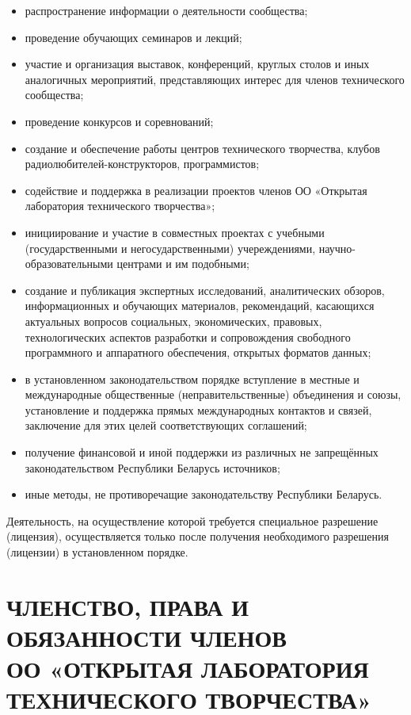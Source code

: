 \documentclass[a4paper,fontsize=14pt,titlepage]{scrartcl}
\newcommand{\OOname}{«Открытая лаборатория технического творчества»}
\newcommand{\OONAME}{«ОТКРЫТАЯ ЛАБОРАТОРИЯ ТЕХНИЧЕСКОГО ТВОРЧЕСТВА»}
\newcommand{\OO}{ОО \OOname}
\begin{document}
\begin{itemize}
\item распространение информации о деятельности сообщества;
\item проведение обучающих семинаров и лекций;
\item участие и организация выставок, конференций, круглых столов и иных аналогичных мероприятий, представляющих интерес для
членов технического сообщества;
\item проведение конкурсов и соревнований;
\item создание и обеспечение работы центров технического творчества,
клубов радиолюбителей-конструкторов, программистов;
\item содействие и поддержка в реализации проектов членов \OO;
\item инициирование и участие в совместных проектах с учебными (государственными и негосударственными) учереждениями,
научно-образовательными центрами и им подобными;
\item создание и публикация экспертных исследований, аналитических обзоров,
информационных и обучающих материалов, рекомендаций, касающихся актуальных вопросов социальных,
экономических, правовых, технологических аспектов разработки и сопровождения свободного программного и аппаратного обеспечения,
открытых форматов данных;
\item в установленном законодательством порядке вступление в местные и международные
общественные (неправительственные) объединения и союзы,
установление и поддержка прямых международных контактов и связей,
заключение для этих целей соответствующих соглашений;
\item получение финансовой и иной поддержки из различных не запрещённых законодательством Республики Беларусь источников;
\item иные методы, не противоречащие законодательству Республики Беларусь.
\end{itemize}
Деятельность, на осуществление которой требуется специальное разрешение (лицензия),
осуществляется только после получения необходимого разрешения (лицензии) в установленном порядке.




\newpage\section{ЧЛЕНСТВО, ПРАВА И ОБЯЗАННОСТИ ЧЛЕНОВ\\ ОО \OONAME}
\end{document}
